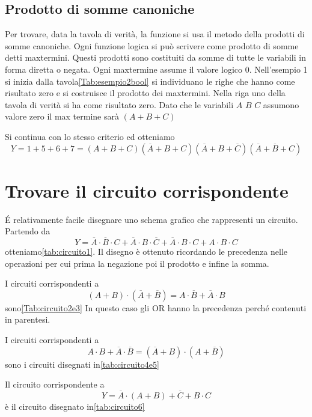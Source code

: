 \subsection{Prodotto di somme canoniche}
Per trovare, data la tavola di verità, la funzione si usa il metodo della prodotti di somme  canoniche. Ogni funzione logica si può scrivere come prodotto di somme detti maxtermini. Questi prodotti sono costituiti da somme di tutte le variabili in forma diretta o negata. Ogni maxtermine assume il valore logico 0.
Nell'esempio 1 si inizia dalla tavola\nobs\vref{Tab:esempio2bool}  si individuano le righe che hanno come risultato zero e si costruisce il prodotto dei maxtermini. Nella riga uno della tavola di verità si ha come risultato zero. Dato che le variabili $A$ $B$ $C$ assumono valore zero il max termine sarà $(A+B+C)$ 

Si continua con lo stesso criterio ed otteniamo\[Y=1+5+6+7=(A+B+C)(\overline{A}+B+C)(\overline{A}+B+ \overline{C})(\overline{A}+\overline{B}+C) \]
\section{Trovare il circuito corrispondente}
\label{Trovarecircuito}
\'E relativamente facile disegnare uno schema grafico che rappresenti un circuito. Partendo da \[Y=\overline{A}\cdot\overline{B}\cdot C+\overline{A}\cdot B\cdot\overline{C}+\overline{A}\cdot B\cdot C+A\cdot B\cdot C\] otteniamo\nobs\vref{tab:circuito1}. Il disegno è ottenuto ricordando le precedenza nelle operazioni per cui prima la negazione poi il prodotto e infine la somma.

I circuiti corrispondenti a \[(A+B)\cdot(\overline{A}+\overline{B})=A\cdot\overline{B}+\overline{A}\cdot B\] sono\nobs\vref{Tab:circuito2e3}
 In questo caso gli OR hanno la precedenza perché contenuti in parentesi.
	
I circuiti corrispondenti a \[A\cdot B+\overline{A}\cdot\overline{B}=(\overline{A}+ B)\cdot(A+\overline{B})\] sono i circuiti disegnati in\nobs\vref{tab:circuito4e5}

Il circuito corrispondente a \[Y=\overline{A}\cdot (A+B)+\overline{C}+B\cdot C\] è il circuito disegnato in\nobs\vref{tab:circuito6}

